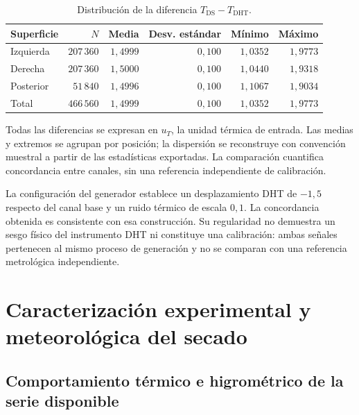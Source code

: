 \begin{table}[htbp]
\centering
\caption{Distribución de la diferencia $T_{\mathrm{DS}}-T_{\mathrm{DHT}}$.}
\label{tab:res_concordancia}
\small
\setlength{\tabcolsep}{5pt}
\begin{tabular}{lrrrrr}
\toprule
Superficie & $N$ & Media & Desv. estándar & Mínimo & Máximo \\
\midrule
Izquierda & $207\,360$ & $1{,}4999$ & $0{,}100$ & $1{,}0352$ & $1{,}9773$ \\
Derecha & $207\,360$ & $1{,}5000$ & $0{,}100$ & $1{,}0440$ & $1{,}9318$ \\
Posterior & $51\,840$ & $1{,}4996$ & $0{,}100$ & $1{,}1067$ & $1{,}9034$ \\
Total & $466\,560$ & $1{,}4999$ & $0{,}100$ & $1{,}0352$ & $1{,}9773$ \\
\bottomrule
\end{tabular}
\par\vspace{3pt}
\begin{minipage}{0.98\textwidth}\footnotesize
Todas las diferencias se expresan en $u_T$, la unidad térmica de entrada. Las medias y extremos se agrupan por posición; la dispersión se reconstruye con convención muestral a partir de las estadísticas exportadas. La comparación cuantifica concordancia entre canales, sin una referencia independiente de calibración.
\end{minipage}
\end{table}


La configuración del generador establece un desplazamiento DHT de $-1{,}5$ respecto del canal base y un ruido térmico de escala $0{,}1$. La concordancia obtenida es consistente con esa construcción. Su regularidad no demuestra un sesgo físico del instrumento DHT ni constituye una calibración: ambas señales pertenecen al mismo proceso de generación y no se comparan con una referencia metrológica independiente.

\FloatBarrier

\section{Caracterización experimental y meteorológica del secado}
\label{res:serie_secado}

\subsection{Comportamiento térmico e higrométrico de la serie disponible}

